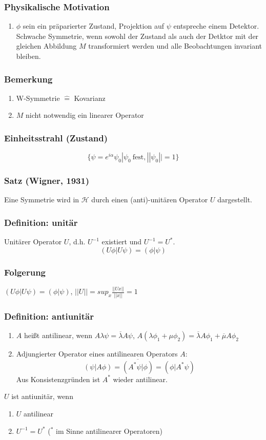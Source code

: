 \documentclass[twoside,a4paper]{scrartcl}
\renewcommand{\1}{\mathds{1}}
\renewcommand{\l}{\lambda}
\renewcommand{\H}{\mathcal{H}}
\begin{document}
\subsubsection*{Physikalische Motivation}
\begin{enumerate}
\item $\phi$ sein ein präparierter Zustand, Projektion auf $\psi$ entspreche einem Detektor.\\
Schwache Symmetrie, wenn sowohl der Zustand als auch der Detktor mit der gleichen Abbildung $M$ transformiert werden und alle Beobachtungen invariant bleiben.
\end{enumerate}
\subsubsection*{Bemerkung}
\begin{enumerate}
\item W-Symmetrie $\mathrel{\widehat{=}}$ Kovarianz
\item $M$ nicht notwendig ein linearer Operator
\end{enumerate}
\subsubsection*{Einheitsstrahl (Zustand)}
$$\{\psi=e^{i\alpha}\psi_0|\psi_0 \ \mathrm{fest}, ||\psi_0||=1\}$$
\subsubsection*{Satz (Wigner, 1931)}
Eine Symmetrie wird in $\H$ durch einen (anti)-unitären Operator $U$ dargestellt.
\subsubsection*{Definition: unitär}
Unitärer Operator $U$, d.h. $U^{-1}$ existiert und $U^{-1}=U^*$.\\
$$(U\phi|U\psi)=(\phi|\psi)$$
\subsubsection*{Folgerung}
$(U\phi|U\psi)=(\phi|\psi)$, $||U||=sup_x \frac{||Ux||}{||x||}=1$
\subsubsection*{Definition: antiunitär}
\begin{enumerate}
\item $A$ heißt antilinear, wenn $A\l \psi=\overline{\l} A \psi$, $A(\l \phi_1+\mu \phi_2)=\overline{\l} A \phi_1+ \overline{\mu}A\phi_2$
\item Adjungierter Operator eines antilinearen Operators $A$:
$$(\psi|A\phi)=\overline{(A^*\psi|\phi)}=(\phi|A^*\psi)$$
Aus Konsistenzgründen ist $A^*$ wieder antilinear.
\end{enumerate}
$U$ ist antiunitär, wenn
\begin{enumerate}
\item $U$ antilinear
\item $U^{-1}=U^*$ ($^*$ im Sinne antilinearer Operatoren)
\end{enumerate}
\end{document}

